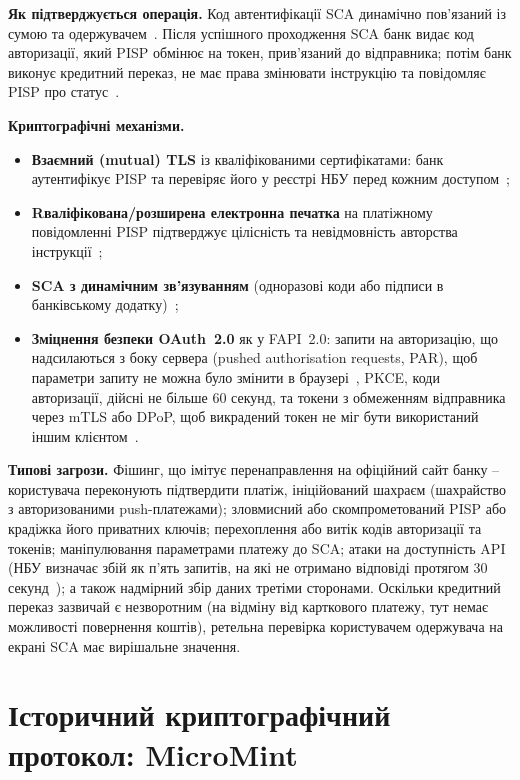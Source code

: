 \textbf{Як підтверджується операція.} Код автентифікації SCA динамічно пов'язаний із сумою та одержувачем~\cite[п.~22]{nbu58}. 
Після успішного проходження SCA банк видає код авторизації, який PISP обмінює на токен, прив'язаний до відправника; 
потім банк виконує кредитний переказ, не має права змінювати інструкцію та повідомляє PISP про статус~\cite[п.~27--28]{nbu80}.

\textbf{Криптографічні механізми.}
\begin{itemize}[noitemsep]
    \item \textbf{Взаємний (mutual) TLS} із кваліфікованими сертифікатами: банк аутентифікує PISP та перевіряє 
        його у реєстрі НБУ перед кожним доступом~\cite[п.~16]{nbu80};
    \item \textbf{Rваліфікована/розширена електронна печатка} на платіжному повідомленні PISP підтверджує 
        цілісність та невідмовність авторства інструкції~\cite[п.~30]{nbu80};
    \item \textbf{SCA з динамічним зв'язуванням} (одноразові коди або підписи в банківському додатку)~\cite{nbu58};
    \item \textbf{Зміцнення безпеки OAuth~2.0} як у FAPI~2.0: запити на авторизацію, що надсилаються з боку 
        сервера (pushed authorisation requests, PAR), щоб параметри запиту не можна було змінити в браузері~\cite{rfc9126}, 
        PKCE, коди авторизації, дійсні не більше 60 секунд, та токени з обмеженням відправника через mTLS або 
        DPoP, щоб викрадений токен не міг бути використаний іншим клієнтом~\cite{fapi2}.
\end{itemize}

\textbf{Типові загрози.} Фішинг, що імітує перенаправлення на офіційний сайт банку -- користувача переконують підтвердити 
платіж, ініційований шахраєм (шахрайство з авторизованими push-платежами); зловмисний або скомпрометований PISP 
або крадіжка його приватних ключів; перехоплення або витік кодів авторизації та токенів; маніпулювання параметрами 
платежу до SCA; атаки на доступність API (НБУ визначає збій як п'ять запитів, на які не отримано відповіді протягом 
30 секунд~\cite[п.~84]{nbu58}); а також надмірний збір даних третіми сторонами. Оскільки кредитний переказ зазвичай 
є незворотним (на відміну від карткового платежу, тут немає можливості повернення коштів), ретельна перевірка 
користувачем одержувача на екрані SCA має вирішальне значення.

\section{Історичний криптографічний протокол: MicroMint}
\label{sec:micromint}

